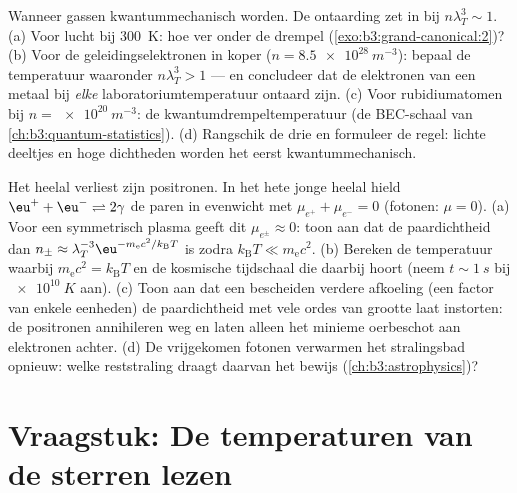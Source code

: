 \begin{exercise}[$\star\star\star$]\label{exo:b3:grand-canonical:11}
Wanneer gassen kwantummechanisch worden. De ontaarding zet in bij
$n\lambda_T^3 \sim
1$. (a) Voor lucht bij \qty{300}{K}: hoe ver onder de
drempel (\cref{exo:b3:grand-canonical:2})? (b) Voor de geleidingselektronen
in koper ($n = \qty{8.5e28}{m^{-3}}$): bepaal de temperatuur waaronder
$n\lambda_T^3 > 1$ --- en concludeer dat de elektronen van een metaal bij
\emph{elke} laboratoriumtemperatuur ontaard zijn. (c) Voor rubidiumatomen
bij $n = \qty{e20}{m^{-3}}$: de kwantumdrempeltemperatuur (de BEC-schaal
van \cref{ch:b3:quantum-statistics}). (d) Rangschik de drie en formuleer de
regel: lichte deeltjes en hoge dichtheden worden het eerst
kwantummechanisch.
\end{exercise}

\begin{exercise}[$\star\star\star$]\label{exo:b3:grand-canonical:12}
Het heelal verliest zijn positronen. In het hete jonge heelal hield
$\eu^+ + \eu^- \rightleftharpoons 2\gamma$ de paren in evenwicht met
$\mu_{e^+} + \mu_{e^-} = 0$ (fotonen: $\mu = 0$). (a) Voor een
symmetrisch plasma geeft dit $\mu_{e^\pm} \approx 0$: toon aan dat de
paardichtheid dan $n_\pm \approx
\lambda_T^{-3}\eu^{-m_{\text{e}}c^2/k_{\text{B}}T}$ is zodra
$k_{\text{B}}T \ll m_{\text{e}}c^2$. (b) Bereken de temperatuur waarbij
$m_{\text{e}}c^2 = k_{\text{B}}T$ en de kosmische tijdschaal die daarbij
hoort (neem $t \sim \qty{1}{s}$ bij $\qty{e10}{K}$ aan). (c) Toon aan dat
een bescheiden verdere afkoeling (een factor van enkele eenheden) de
paardichtheid met vele ordes van grootte laat instorten: de positronen
annihileren weg en laten alleen het minieme oerbeschot aan elektronen
achter. (d) De vrijgekomen fotonen verwarmen het stralingsbad opnieuw:
welke reststraling draagt daarvan het bewijs
(\cref{ch:b3:astrophysics})?
\end{exercise}

\section{Vraagstuk: De temperaturen van de sterren lezen}

